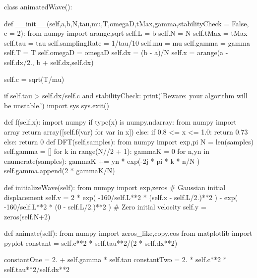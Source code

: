 \begin{codeexample}
\begin{VerbatimOut}{\listingFile}


class animatedWave():

    def __init__(self,a,b,N,tau,mu,T,omegaD,tMax,gamma,stabilityCheck = False, c = 2):
        from numpy import arange,sqrt
        self.L = b
        self.N = N
        self.tMax = tMax
        self.tau = tau
        self.samplingRate = 1/tau/10
        self.mu = mu
        self.gamma = gamma
        self.T = T
        self.omegaD = omegaD
        self.dx = (b - a)/N
        self.x = arange(a - self.dx/2., b + self.dx,self.dx)

        self.c = sqrt(T/mu)

        if self.tau > self.dx/self.c and stabilityCheck:
            print('Beware: your algorithm will be unstable.')
            import sys
            sys.exit()

    def f(self,x):
        import numpy
        if type(x) is numpy.ndarray:
            from numpy import array
            return array([self.f(var) for var in x])
        else:
            if 0.8 <= x <= 1.0:
                return 0.73
            else:
                return 0
    def DFT(self,samples):
        from numpy import exp,pi
        N = len(samples)
        self.gamma = []
        for k in range(N//2 + 1):
            gammaK = 0
            for n,yn in enumerate(samples):
                gammaK += yn * exp(-2j * pi * k * n/N )
            self.gamma.append(2 * gammaK/N)
        

    def initializeWave(self):
        from numpy import exp,zeros
        # Gaussian initial displacement
        self.v = 2 * exp( -160/self.L**2 * (self.x - self.L/2.)**2 ) - exp( -160/self.L**2 * (0 - self.L/2.)**2 )
        # Zero initial velocity
        self.y = zeros(self.N+2)


    def animate(self):
        from numpy import zeros_like,copy,cos
        from matplotlib import pyplot
        constant = self.c**2 * self.tau**2/(2 * self.dx**2)

        constantOne = 2. + self.gamma * self.tau
        constantTwo = 2. * self.c**2 * self.tau**2/self.dx**2


\end{VerbatimOut}
\end{codeexample}
